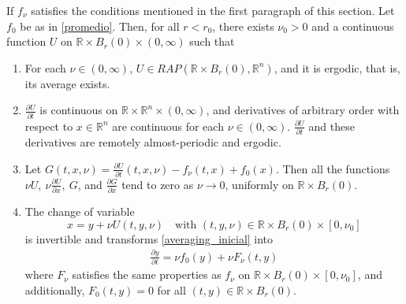 \documentclass[10pt,a4paper]{amsart}
\begin{document}
\begin{lem}\label{lem_transformacion}
If $f_\nu$ satisfies the conditions mentioned in the first paragraph of this section.  
Let $f_0$ be as in \eqref{promedio}. Then, for all $r<r_0$, there exists $\nu_0>0$ and a continuous function $U$ on $\mathbb{R}\times B_{r}(0)\times (0,\infty)$ such that
\begin{enumerate}
\item For each $\nu\in(0,\infty)$, $U\in RAP(\mathbb{R}\times B_{r}(0),\mathbb{R}^n)$, and it is ergodic, that is, its average exists.

\item $\frac{\partial U}{\partial t}$ is continuous on $\mathbb{R}\times \mathbb{R}^n\times (0,\infty)$, and derivatives of arbitrary order with respect to $x\in\mathbb{R}^n$ are continuous for each $\nu\in (0,\infty)$.  
$\frac{\partial U}{\partial t}$ and these derivatives are remotely almost-periodic and ergodic.

\item Let $G(t,x,\nu)=\frac{\partial U}{\partial t}(t,x,\nu)-f_{\nu}(t,x)+f_{0}(x)$.  
Then all the functions $\nu U,\ \nu \frac{\partial U}{\partial x},\ G$, and $\frac{\partial G}{\partial x}$ tend to zero as $\nu\rightarrow 0$, uniformly on $\mathbb{R}\times B_{r}(0)$.

\item The change of variable  
\begin{equation}
x=y+\nu U(t,y,\nu) \quad \text{with } (t,y,\nu)\in\mathbb{R}\times B_{r}(0)\times [0,\nu_0] \label{cambio_variable}
\end{equation}  
is invertible and transforms \eqref{averaging_inicial} into  
\begin{eqnarray}
\frac{\partial y}{\partial t}=\nu f_{0}(y)+\nu F_{\nu}(t,y)\label{reducida}
\end{eqnarray}  
where $F_{\nu}$ satisfies the same properties as $f_{\nu}$ on $\mathbb{R}\times B_{r}(0)\times[0,\nu_{0}]$, and additionally, $F_{0}(t,y)=0$ for all $(t,y)\in\mathbb{R}\times B_{r}(0)$.
\end{enumerate}
\end{lem}
\end{document}
